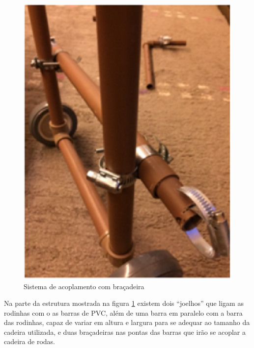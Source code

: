 \begin{figure}[!htb]
\centering
\includegraphics[keepaspectratio=true,scale=0.4]{figuras/resultados/acop_bracadeira}
\caption{Sistema de acoplamento com braçadeira}
\label{fig:acop_bracadeira}
\end{figure}

Na parte da estrutura mostrada na figura \ref{fig:acop_bracadeira} existem dois “joelhos” que ligam as rodinhas com o as barras de PVC, além de uma barra em paralelo com a barra das rodinhas, capaz de variar em altura e largura para se adequar ao tamanho da cadeira utilizada, e  duas braçadeiras nas pontas das barras que irão se acoplar a cadeira de rodas.

